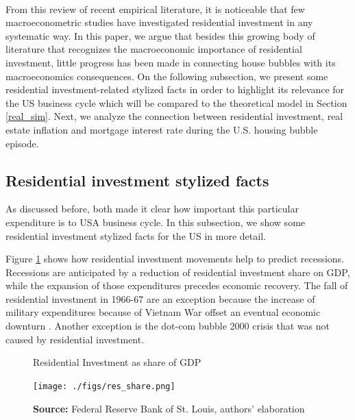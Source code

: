 \documentclass[11pt]{article}
\begin{document}
\\
From this review of recent empirical literature, it is noticeable that few macroeconometric studies have investigated residential investment in any systematic way.
In this paper, we argue that besides this growing body of literature that recognizes the macroeconomic importance of residential investment, little progress has been made in connecting house bubbles with its macroeconomics consequences.
On the following subsection, we present some residential investment-related stylized facts in order to highlight its relevance for the US business cycle which will be compared to the theoretical model in Section \ref{real_sim}.
Next, we analyze the connection between residential investment, real estate inflation and mortgage interest rate during the U.S. housing bubble episode.

\subsection{Residential investment stylized facts}
\label{sec:org4da7d7f}

As discussed before, both \textcites{green_follow_1997}{leamer_housing_2007} made it clear how important this particular expenditure is to USA business cycle. In this subsection, we show some residential investment stylized facts for the US in more detail.

Figure \ref{Investo_Resid_GDP} shows how residential investment movements help to predict recessions. Recessions are anticipated by a reduction of residential investment share on GDP, while the expansion of those expenditures precedes economic recovery. The fall of residential investment in 1966-67 are an exception because the increase of military expenditures because of Vietnam War offset an eventual economic downturn \cite[p.~20]{leamer_housing_2007}. Another exception is the dot-com bubble 2000 crisis that was not caused by residential investment.



\begin{figure}[htb]
    \centering
        \caption{Residential Investment as share of GDP}
        \label{Investo_Resid_GDP}
    \texttt{[image: ./figs/res\_share.png]}
    \caption*{\textbf{Source:} Federal Reserve Bank of St. Louis, authors’ elaboration}
\end{figure}
\end{document}
